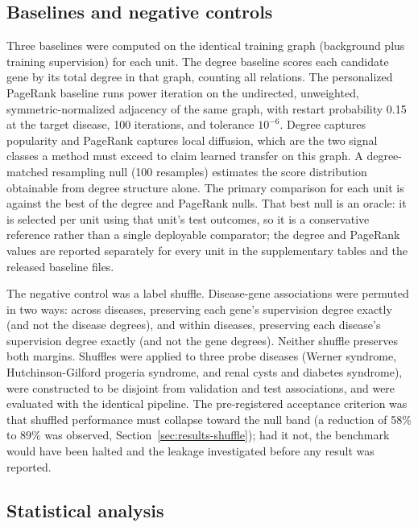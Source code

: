 \documentclass[11pt]{article}
\begin{document}
\subsection{Baselines and negative controls}

Three baselines were computed on the identical training graph (background plus training supervision) for each unit. The degree baseline scores each candidate gene by its total degree in that graph, counting all relations. The personalized PageRank baseline \cite{page1999} runs power iteration on the undirected, unweighted, symmetric-normalized adjacency of the same graph, with restart probability 0.15 at the target disease, 100 iterations, and tolerance $10^{-6}$. Degree captures popularity and PageRank captures local diffusion, which are the two signal classes a method must exceed to claim learned transfer on this graph. A degree-matched resampling null (100 resamples) estimates the score distribution obtainable from degree structure alone. The primary comparison for each unit is against the best of the degree and PageRank nulls. That best null is an oracle: it is selected per unit using that unit's test outcomes, so it is a conservative reference rather than a single deployable comparator; the degree and PageRank values are reported separately for every unit in the supplementary tables and the released baseline files.

The negative control was a label shuffle. Disease-gene associations were permuted in two ways: across diseases, preserving each gene's supervision degree exactly (and not the disease degrees), and within diseases, preserving each disease's supervision degree exactly (and not the gene degrees). Neither shuffle preserves both margins. Shuffles were applied to three probe diseases (Werner syndrome, Hutchinson-Gilford progeria syndrome, and renal cysts and diabetes syndrome), were constructed to be disjoint from validation and test associations, and were evaluated with the identical pipeline. The pre-registered acceptance criterion was that shuffled performance must collapse toward the null band (a reduction of 58\% to 89\% was observed, Section~\ref{sec:results-shuffle}); had it not, the benchmark would have been halted and the leakage investigated before any result was reported.

\subsection{Statistical analysis}
\end{document}
